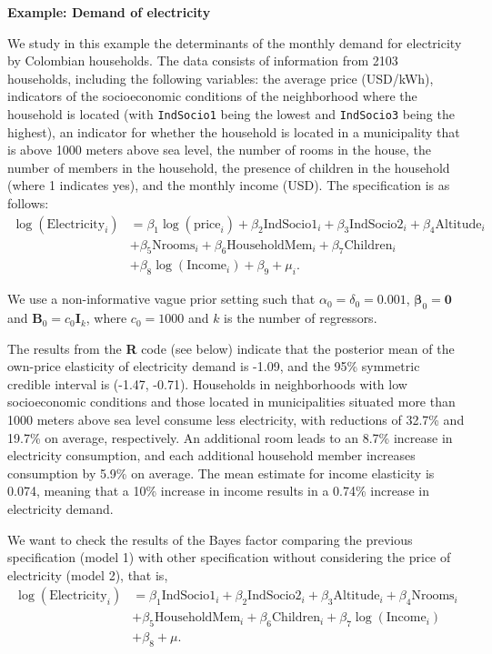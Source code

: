 \textbf{Example: Demand of electricity}

We study in this example the determinants of the monthly demand for electricity by Colombian households. The data consists of information from 2103 households, including the following variables: the average price (USD/kWh), indicators of the socioeconomic conditions of the neighborhood where the household is located (with \texttt{IndSocio1} being the lowest and \texttt{IndSocio3} being the highest), an indicator for whether the household is located in a municipality that is above 1000 meters above sea level, the number of rooms in the house, the number of members in the household, the presence of children in the household (where 1 indicates yes), and the monthly income (USD). The specification is as follows:
\begin{align*}
	\log(\text{Electricity}_i) & = \beta_1\log(\text{price}_i) + \beta_2\text{IndSocio1}_i + \beta_3\text{IndSocio2}_i + \beta_4\text{Altitude}_i \\
	& + \beta_5\text{Nrooms}_i + \beta_6\text{HouseholdMem}_i + \beta_7\text{Children}_i\\
	& + \beta_8\log(\text{Income}_i) + \beta_9 + \mu_i.
\end{align*}

We use a non-informative vague prior setting such that $\alpha_0=\delta_0=0.001$, $\bm{\beta}_0=\bm{0}$ and $\bm{B}_0=c_0\bm{I}_k$, where $c_0=1000$ and $k$ is the number of regressors. 

The results from the \textbf{R} code (see below) indicate that the posterior mean of the own-price elasticity of electricity demand is -1.09, and the 95\% symmetric credible interval is (-1.47, -0.71). Households in neighborhoods with low socioeconomic conditions and those located in municipalities situated more than 1000 meters above sea level consume less electricity, with reductions of 32.7\% and 19.7\% on average, respectively. An additional room leads to an 8.7\% increase in electricity consumption, and each additional household member increases consumption by 5.9\% on average. The mean estimate for income elasticity is 0.074, meaning that a 10\% increase in income results in a 0.74\% increase in electricity demand.

We want to check the results of the Bayes factor comparing the previous specification (model 1) with other specification without considering the price of electricity (model 2), that is,
\begin{align*}
	\log(\text{Electricity}_i) & = \beta_1\text{IndSocio1}_i + \beta_2\text{IndSocio2}_i + \beta_3\text{Altitude}_i + \beta_4\text{Nrooms}_i\\
	& + \beta_5\text{HouseholdMem}_i + \beta_6\text{Children}_i + \beta_7\log(\text{Income}_i)\\
	& + \beta_8 + \mu.
\end{align*}

